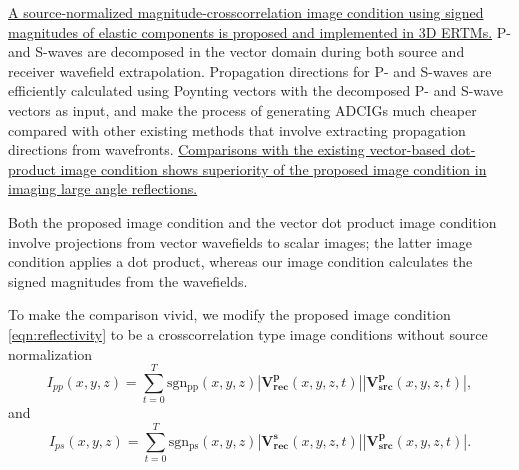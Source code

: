 \documentclass[manuscript,ulem,graphix,revised]{geophysics}
\begin{document}
\uline{A source-normalized \marginpar{[1,12]} magnitude-crosscorrelation image condition using signed magnitudes of elastic components is proposed and implemented in 3D ERTMs.} P- and S-waves are decomposed in the vector domain during both source and receiver wavefield extrapolation. Propagation directions for P- and S-waves are efficiently calculated using Poynting vectors with the decomposed P- and S-wave vectors as input, and make the process of generating ADCIGs much cheaper compared with other existing methods that involve extracting propagation directions from wavefronts. \marginpar{[1,12]}\uline{Comparisons with the existing vector-based dot-product image condition shows superiority of the proposed image condition in imaging large angle reflections.}


%


Both the proposed image condition and the vector dot product image condition \citep{wang_cl16,zhu17,du17} involve projections from vector wavefields to scalar images; the latter image condition applies a dot product, whereas our image condition calculates the signed magnitudes from the wavefields.

To make the comparison vivid, we modify the proposed image condition \ref{eqn:reflectivity} to be a crosscorrelation type image conditions without source normalization
\begin{equation}
I_{pp}(x,y,z)=\sum_{t=0}^{T}\mathrm{sgn_{pp}}(x,y,z)|\mathbf{V^p_{rec}}(x,y,z,t)||\mathbf{V^p_{src}}(x,y,z,t)|,
\label{eqn:crsc1}
\end{equation}
and
\begin{equation}
I_{ps}(x,y,z)=\sum_{t=0}^{T}\mathrm{sgn_{ps}}(x,y,z)|\mathbf{V^s_{rec}}(x,y,z,t)||\mathbf{V^p_{src}}(x,y,z,t)|.
\label{eqn:crsc2}
\end{equation}
\end{document}
